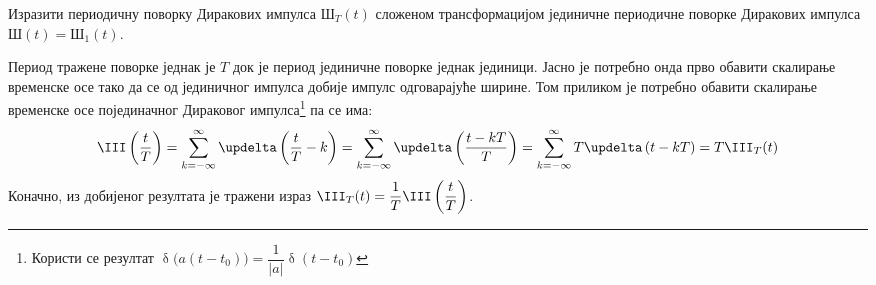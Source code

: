 \PID Изразити периодичну поворку Диракових импулса $\text{Ш}_T(t)$ 
сложеном трансформацијом 
јединичне периодичне поворке Диракових импулса $\text{Ш}(t) = \text{Ш}_1(t)$.

\indent 
\RESENJE  Период тражене поворке једнак је $T$ док је период јединичне поворке једнак
јединици. Јасно је потребно онда прво обавити скалирање временске осе тако да се од јединичног 
импулса добије импулс одговарајуће ширине. Том приликом је потребно обавити скалирање 
временске осе појединачног Дираковог импулса\footnote{Користи се резултат 
$\updelta\bigl(a(t-t_0)\bigr) = \dfrac{1}{|a|} \updelta(t - t_0)$} па се има:
\begin{equation}
    \III\left(\dfrac tT\right) = 
    \sum_{k = -\infty}^{\infty} 
    \updelta \left( \dfrac tT - k \right)
    =
    \sum_{k = -\infty}^{\infty} 
    \updelta \left( \dfrac{t - kT}{T} \right) 
    = 
    \sum_{k = -\infty}^{\infty} 
    T \updelta \left( t - kT \right) 
    = T \III_T(t)
\end{equation}
Коначно, из добијеног резултата је тражени израз $\III_T(t) = \dfrac1T \III\left(\dfrac tT\right)$.
\vfill